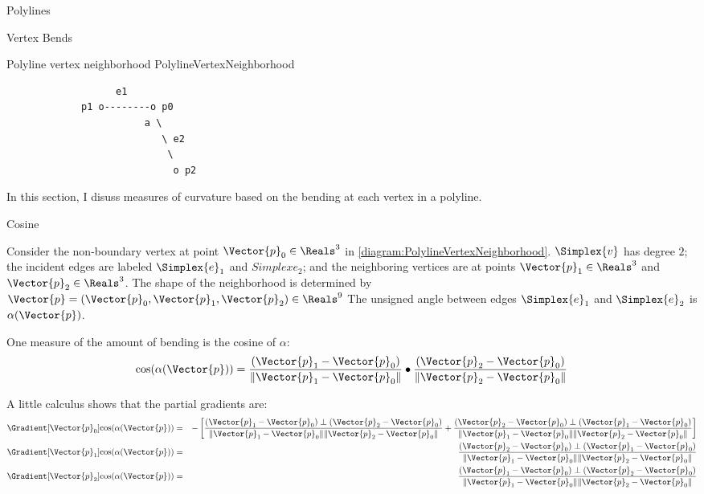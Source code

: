 \begin{plSection}{Polylines}
\begin{plSection}{Vertex Bends}
\label{sec:Vertex-Bends}

\begin{plDiagram}
{Polyline vertex neighborhood}
{PolylineVertexNeighborhood}
\centering
\begin{verbatim}
                   e1
             p1 o--------o p0
                        a \
                           \ e2
                            \
                             o p2
\end{verbatim}
\end{plDiagram}

In this section, I disuss measures of curvature
based on the bending at each vertex in a polyline.

\end{plSection}%
\begin{plSection}{Cosine}
\label{sec:polyline-vertex-cosine}

Consider the non-boundary vertex
at point $\Vector{p}_0 \in \Reals^3$ in \cref{diagram:PolylineVertexNeighborhood}.
$\Simplex{v}$ has degree $2$;
the incident edges are labeled $\Simplex{e}_1$ and $Simplex{e}_2$;
and the neighboring vertices are at points $\Vector{p}_1 \in \Reals^3$
and $\Vector{p}_2 \in \Reals^3$.
The shape of the neighborhood is determined by
$\Vector{p} = (\Vector{p}_0, \Vector{p}_1, \Vector{p}_2) \in \Reals^9$
The unsigned angle between edges 
$\Simplex{e}_1$ and $\Simplex{e}_2$ is $\alpha(\Vector{p})$.

One measure of the amount of bending is the cosine of $\alpha$:
\begin{equation}
\cos(\alpha(\Vector{p})) =
{{(\Vector{p}_1 - \Vector{p}_0)} \over {\| \Vector{p}_1 - \Vector{p}_0 \|} }
\bullet
{{(\Vector{p}_2 - \Vector{p}_0)} \over {\| \Vector{p}_2 - \Vector{p}_0 \|} }
\end{equation}

A little calculus shows that the partial gradients are:
\begin{eqnarray}
\label{eq:polyline-vertex-cosine-gradient}
\Gradient[\Vector{p}_0]{\cos(\alpha(\Vector{p}))}
& = &
-
\left[
{{(\Vector{p}_1 - \Vector{p}_0) \perp  (\Vector{p}_2 - \Vector{p}_0)}
\over
{\| \Vector{p}_1 - \Vector{p}_0 \| \| \Vector{p}_2 - \Vector{p}_0 \|} }
+
{{(\Vector{p}_2 - \Vector{p}_0) \perp  (\Vector{p}_1 - \Vector{p}_0)}
\over
{\| \Vector{p}_1 - \Vector{p}_0 \| \| \Vector{p}_2 - \Vector{p}_0 \|} }
\right]
\\
\Gradient[\Vector{p}_1]{\cos(\alpha(\Vector{p}))}
& = &
{{(\Vector{p}_2 - \Vector{p}_0) \perp  (\Vector{p}_1 - \Vector{p}_0)}
\over
{\| \Vector{p}_1 - \Vector{p}_0 \| \| \Vector{p}_2 - \Vector{p}_0 \|} }
\nonumber
\\
\Gradient[\Vector{p}_2]{\cos(\alpha(\Vector{p}))}
& = &
{{(\Vector{p}_1 - \Vector{p}_0) \perp  (\Vector{p}_2 - \Vector{p}_0)}
\over
{\| \Vector{p}_1 - \Vector{p}_0 \| \| \Vector{p}_2 - \Vector{p}_0 \|} }
\nonumber
\end{eqnarray}


\end{plSection}
\end{plSection}
